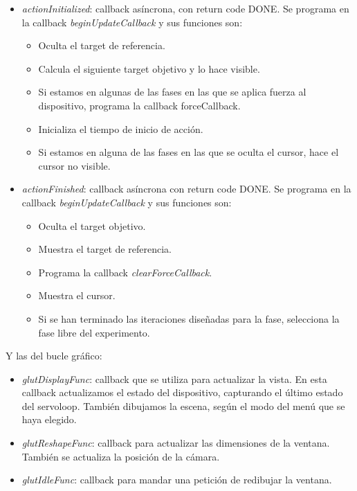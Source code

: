 \documentclass[a4paper,11pt, oneside]{book}
\begin{document}
\begin{itemize}
	\item \textit{actionInitialized}: callback asíncrona, con return code DONE. Se programa en la callback \textit{beginUpdateCallback} y sus funciones son:
	\begin{itemize}
		\item Oculta el target de referencia.
		\item Calcula el siguiente target objetivo y lo hace visible.
		\item Si estamos en algunas de las fases en las que se aplica fuerza al dispositivo, programa la callback forceCallback. 
		\item Inicializa el tiempo de inicio de acción.
		\item Si estamos en alguna de las fases en las que se oculta el cursor, hace el cursor no visible.
	\end{itemize}
	
	\item \textit{actionFinished}: callback asíncrona con return code DONE. Se programa en la callback \textit{beginUpdateCallback} y sus funciones son:
	\begin{itemize}
		\item Oculta el target objetivo.
		\item Muestra el target de referencia.
		\item Programa la callback \textit{clearForceCallback}.
		\item Muestra el cursor.
		\item Si se han terminado las iteraciones diseñadas para la fase, selecciona la fase libre del experimento.
	\end{itemize}
\end{itemize}
Y las del bucle gráfico:
\begin{itemize}
	\item \textit{glutDisplayFunc}: callback que se utiliza para actualizar la vista. En esta callback actualizamos el estado del dispositivo, capturando el último estado del servoloop. También dibujamos la escena, según el modo del menú que se haya elegido. 
	
	\item \textit{glutReshapeFunc}: callback para actualizar las dimensiones de la ventana. También se actualiza la posición de la cámara.
	
	\item \textit{glutIdleFunc}: callback para mandar una petición de redibujar la ventana.	
\end{itemize}
\end{document}

